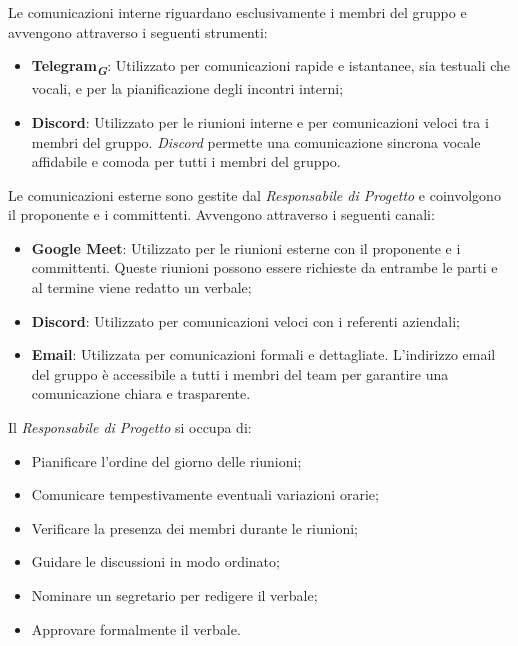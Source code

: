 Le comunicazioni interne riguardano esclusivamente i membri del gruppo e avvengono attraverso i seguenti strumenti:
\begin{itemize}
    \item \textbf{Telegram}\textsubscript{\textit{\textbf{G}}}: Utilizzato per comunicazioni rapide e istantanee, sia testuali che vocali, e per la pianificazione degli incontri interni;
    \item \textbf{Discord}: Utilizzato per le riunioni interne e per comunicazioni veloci tra i membri del gruppo. \emph{Discord} permette una comunicazione sincrona vocale affidabile e comoda per tutti i membri del gruppo.
\end{itemize}

Le comunicazioni esterne sono gestite dal \emph{Responsabile di Progetto} e coinvolgono il proponente e i committenti. Avvengono attraverso i seguenti canali:
\begin{itemize}
    \item \textbf{Google Meet}: Utilizzato per le riunioni esterne con il proponente e i committenti. Queste riunioni possono essere richieste da entrambe le parti e al termine viene redatto un verbale;
    \item \textbf{Discord}: Utilizzato per comunicazioni veloci con i referenti aziendali;
    \item \textbf{Email}: Utilizzata per comunicazioni formali e dettagliate. L'indirizzo email del gruppo è accessibile a tutti i membri del team per garantire una comunicazione chiara e trasparente.
\end{itemize}

Il \emph{Responsabile di Progetto} si occupa di:
\begin{itemize}
    \item Pianificare l'ordine del giorno delle riunioni;
    \item Comunicare tempestivamente eventuali variazioni orarie;
    \item Verificare la presenza dei membri durante le riunioni;
    \item Guidare le discussioni in modo ordinato;
    \item Nominare un segretario per redigere il verbale;
    \item Approvare formalmente il verbale.
\end{itemize}

